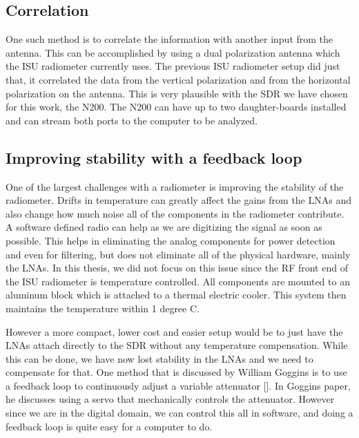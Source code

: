 \subsection{Correlation}  
One such method is to correlate the information with another input from the antenna.  This can be accomplished by using a dual polarization antenna which the ISU radiometer currently uses.  The previous ISU radiometer setup did just that, it correlated the data from the vertical polarization and from the horizontal polarization on the antenna.  This is very plausible with the SDR we have chosen for this work, the N200.  The N200 can have up to two daughter-boards installed and can stream both ports to the computer to be analyzed.  

\subsection{Improving stability with a feedback loop}

One of the largest challenges with a radiometer is improving the stability of the radiometer.  Drifts in temperature can greatly affect the gains from the LNAs and also change how much noise all of the components in the radiometer contribute.  A software defined radio can help as we are digitizing the signal as soon as possible.  This helps in eliminating the analog components for power detection and even for filtering, but does not eliminate all of the physical hardware, mainly the LNAs.  In this thesis, we did not focus on this issue since the RF front end of the ISU radiometer is temperature controlled.  All components are mounted to an aluminum block which is attached to a thermal electric cooler.  This system then maintains the temperature within 1 degree C.  

However a more compact, lower cost and easier setup would be to just have the LNAs attach directly to the SDR without any temperature compensation.  While this can be done, we have now lost stability in the LNAs and we need to compensate for that.  One method that is discussed by William Goggins is to use a feedback loop to continuously adjust a variable attenuator [\cite{Goggins}].  In Goggins paper, he discusses using a servo that mechanically controls the attenuator.  However since we are in the digital domain, we can control this all in software, and doing a feedback loop is quite easy for a computer to do.  